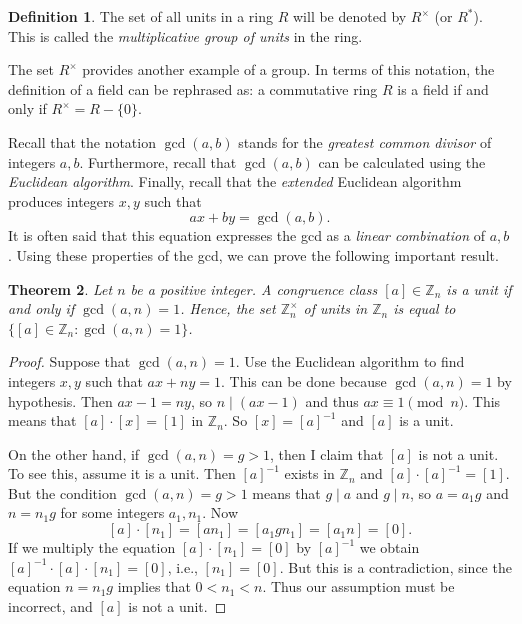 \documentclass[11pt]{article}
\newtheorem{thm}{Theorem}[section]
\theoremstyle{definition}
\newtheorem{defn}[thm]{Definition}
\newcommand{\Z}{\mathbb{Z}} %
\begin{document}
\begin{defn}
  The set of all units in a ring $R$ will be denoted by
  $R^\times$ (or $R^*$). This is called the
  \emph{multiplicative group of
    units} in the ring.
\end{defn}
 
The set $R^\times$ provides another example of a group. 
In terms of this notation, the definition of a field can be rephrased
as: a commutative ring $R$ is a field if and only if $R^\times =
R-\{0\}$.

Recall that the notation $\gcd(a,b)$ stands for the \emph{greatest
  common divisor} of integers $a,b$. Furthermore, recall
that $\gcd(a,b)$ can be calculated using the \emph{Euclidean
  algorithm}. Finally, recall that the
\emph{extended} Euclidean algorithm produces integers $x,y$ such that
\[
   ax+by = \gcd(a,b).
\]
It is often said that this equation expresses the gcd as a
\emph{linear combination} of $a,b$. Using these properties of the gcd,
we can prove the following important result.


\begin{thm}\label{thm:gcd}
  Let $n$ be a positive integer. A congruence class $[a] \in \Z_n$ is
  a unit if and only if $\gcd(a,n) = 1$. Hence, the set $\Z_n^\times$
  of units in $\Z_n$ is equal to $\{ [a] \in \Z_n : \gcd(a,n) = 1 \}$.
\end{thm}

\begin{proof}
Suppose that $\gcd(a,n)=1$. Use the Euclidean algorithm to find
integers $x,y$ such that $ax+ny = 1$. This can be done because
$\gcd(a,n)=1$ by hypothesis. Then $ax-1 = ny$, so $n \mid (ax-1)$ and
thus $ax \equiv 1 \pmod{n}$. This means that $[a] \cdot [x] = [1]$ in
$\Z_n$. So $[x] = [a]^{-1}$ and $[a]$ is a unit.

On the other hand, if $\gcd(a,n) = g > 1$, then I claim that $[a]$ is
not a unit. To see this, assume it is a unit. Then $[a]^{-1}$ exists
in $\Z_n$ and $[a]\cdot [a]^{-1} = [1]$. But the condition $\gcd(a,n)
= g > 1$ means that $g \mid a$ and $g \mid n$, so $a = a_1 g$ and $n =
n_1 g$ for some integers $a_1, n_1$. Now
\[
  [a]\cdot [n_1] = [an_1] = [a_1gn_1] = [a_1n] = [0].
\]
If we multiply the equation $[a]\cdot [n_1] = [0]$ by $[a]^{-1}$ we
obtain $[a]^{-1} \cdot [a] \cdot [n_1] = [0]$, i.e., $[n_1] = [0]$.
But this is a contradiction, since the equation $n = n_1 g$ implies
that $0 < n_1 < n$. Thus our assumption must be incorrect, and $[a]$
is not a unit.
\end{proof}
\end{document}
